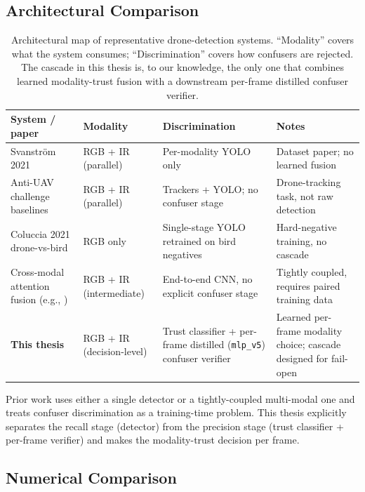 \subsection{Architectural Comparison}

\begin{table}[htbp]
    \centering
    \caption{Architectural map of representative drone-detection systems. ``Modality'' covers what the system consumes; ``Discrimination'' covers how confusers are rejected. The cascade in this thesis is, to our knowledge, the only one that combines learned modality-trust fusion with a downstream per-frame distilled confuser verifier.}
    \label{tab:related_systems}
    \begin{tabular}{p{4.0cm}lll}
        \toprule
        System / paper & Modality & Discrimination & Notes \\
        \midrule
        Svanstr\"om 2021~\cite{svanstrom2021real} & RGB + IR (parallel) & Per-modality YOLO only & Dataset paper; no learned fusion \\
        Anti-UAV challenge baselines~\cite{jiang2021antiuav} & RGB + IR (parallel) & Trackers + YOLO; no confuser stage & Drone-tracking task, not raw detection \\
        Coluccia 2021 drone-vs-bird~\cite{coluccia2021dronevsbird} & RGB only & Single-stage YOLO retrained on bird negatives & Hard-negative training, no cascade \\
        Cross-modal attention fusion (e.g., \cite{wagner2016multispectral}) & RGB + IR (intermediate) & End-to-end CNN, no explicit confuser stage & Tightly coupled, requires paired training data \\
        \textbf{This thesis} & RGB + IR (decision-level) & Trust classifier + per-frame distilled (\texttt{mlp\_v5}) confuser verifier & Learned per-frame modality choice; cascade designed for fail-open \\
        \bottomrule
    \end{tabular}
\end{table}

Prior work uses either a single detector or a tightly-coupled multi-modal one and treats confuser discrimination as a training-time problem. This thesis explicitly separates the recall stage (detector) from the precision stage (trust classifier + per-frame verifier) and makes the modality-trust decision per frame.

\subsection{Numerical Comparison}

